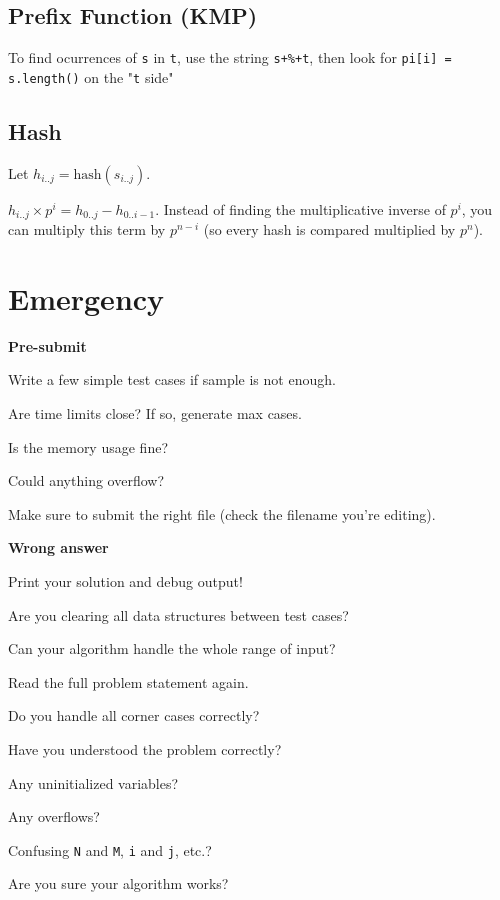 \documentclass[a4paper]{article}
\begin{document}
\subsection{Prefix Function (KMP)}
To find ocurrences of \texttt{s} in \texttt{t}, use the string \texttt{s+\%+t}, then look for \texttt{pi[i] = s.length()} on the "\texttt{t} side"

\subsection{Hash}
Let $h_{i..j} = \textrm{hash}(s_{i..j})$.

$h_{i..j}\times p^i = h_{0..j} - h_{0..i-1}$. Instead of finding the multiplicative inverse of $p^i$, you can multiply this term by $p^{n-i}$ (so every hash is compared multiplied by $p^n$).

\section{Emergency}
\noindent
\textbf{Pre-submit}

\noindent
Write a few simple test cases if sample is not enough.

\noindent
Are time limits close? If so, generate max cases.

\noindent
Is the memory usage fine?

\noindent
Could anything overflow?

\noindent
Make sure to submit the right file (check the filename you're editing).

\noindent
\textbf{Wrong answer}

\noindent
Print your solution and debug output!

\noindent
Are you clearing all data structures between test cases?

\noindent
Can your algorithm handle the whole range of input?

\noindent
Read the full problem statement again.

\noindent
Do you handle all corner cases correctly?

\noindent
Have you understood the problem correctly?

\noindent
Any uninitialized variables?

\noindent
Any overflows?

\noindent
Confusing \texttt{N} and \texttt{M}, \texttt{i} and \texttt{j}, etc.?

\noindent
Are you sure your algorithm works?
\end{document}
